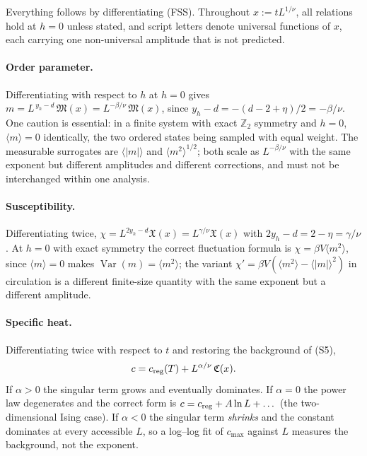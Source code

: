 \documentclass[10pt,a4paper]{article}
\theoremstyle{remark}
\newcommand{\Var}{\operatorname{Var}}
\begin{document}
Everything follows by differentiating (FSS). Throughout $x:= tL^{1/\nu}$, all
relations hold at $h=0$ unless stated, and script letters denote universal
functions of $x$, each carrying one non-universal amplitude that is not
predicted.

\paragraph{Order parameter.} Differentiating with respect to $h$ at $h=0$ gives
$m=L^{\,y_h-d}\,\mathfrak{M}(x)=L^{-\beta/\nu}\,\mathfrak{M}(x)$, since
$y_h-d=-(d-2+\eta)/2=-\beta/\nu$. One caution is essential: in a finite system
with exact $\mathbb{Z}_2$ symmetry and $h=0$, $\langle m\rangle=0$ identically,
the two ordered states being sampled with equal weight. The measurable surrogates
are $\langle|m|\rangle$ and $\langle m^{2}\rangle^{1/2}$; both scale as
$L^{-\beta/\nu}$ with the same exponent but different amplitudes and different
corrections, and must not be interchanged within one analysis.

\paragraph{Susceptibility.} Differentiating twice,
$\chi=L^{2y_h-d}\mathfrak{X}(x)=L^{\gamma/\nu}\mathfrak{X}(x)$ with
$2y_h-d=2-\eta=\gamma/\nu$. At $h=0$ with exact symmetry the correct fluctuation
formula is
$\chi=\beta V\langle m^{2}\rangle$, since $\langle m\rangle=0$ makes
$\Var(m)=\langle m^{2}\rangle$; the variant
$\chi'=\beta V(\langle m^{2}\rangle-\langle|m|\rangle^{2})$ in circulation is a
different finite-size quantity with the same exponent but a different amplitude.

\paragraph{Specific heat.} Differentiating twice with respect to $t$ and
restoring the background of (S5),
\[
c=c_{\rm reg}(T)+L^{\alpha/\nu}\,\mathfrak{C}(x) .
\]
If $\alpha>0$ the singular term grows and eventually dominates. If $\alpha=0$ the
power law degenerates and the correct form is $c=c_{\rm reg}+A\ln L+\dots$ (the
two-dimensional Ising case). If $\alpha<0$ the singular term \emph{shrinks} and
the constant dominates at every accessible $L$, so a log--log fit of $c_{\max}$
against $L$ measures the background, not the exponent.
\end{document}
